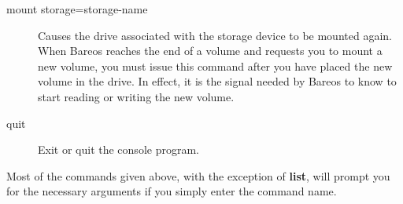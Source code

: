 \begin{description}
\item [mount storage=storage-name]
   Causes the drive associated with the  storage device to be mounted again. When
Bareos reaches the end of a volume and requests you to mount a  new volume,
you must issue this command after you have placed the  new volume in the
drive. In effect, it is the signal needed by  Bareos to know to start reading
or writing the new volume.

\item [quit]
   Exit or quit the console program.
\end{description}

Most of the commands given above, with the exception of {\bf list}, will
prompt you for the necessary arguments if you simply enter the command name.


%
%
% 
% 
% 
% 
% 
% 

